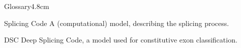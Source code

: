 \begin{mclistof}{Glossary}{4.8cm}
\item[Splicing Code] A (computational) model, describing the splicing process.
\item[DSC] Deep Splicing Code, a model used for constitutive exon classification.



\end{mclistof} 
